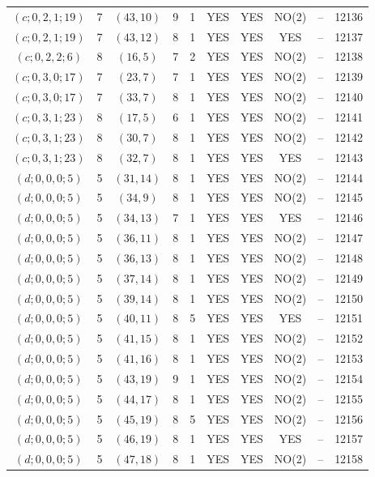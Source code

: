 \begin{longtable}{|c|c|c|c|c|c|c|c|c|c|}
$(c; 0, 2, 1; 19)$ & 7 & $(43, 10)$ & 9 & 1 & YES & YES & NO(2) & -- & 12136\\
$(c; 0, 2, 1; 19)$ & 7 & $(43, 12)$ & 8 & 1 & YES & YES & YES & -- & 12137\\
$(c; 0, 2, 2; 6)$ & 8 & $(16, 5)$ & 7 & 2 & YES & YES & NO(2) & -- & 12138\\
$(c; 0, 3, 0; 17)$ & 7 & $(23, 7)$ & 7 & 1 & YES & YES & NO(2) & -- & 12139\\
$(c; 0, 3, 0; 17)$ & 7 & $(33, 7)$ & 8 & 1 & YES & YES & NO(2) & -- & 12140\\
$(c; 0, 3, 1; 23)$ & 8 & $(17, 5)$ & 6 & 1 & YES & YES & NO(2) & -- & 12141\\
$(c; 0, 3, 1; 23)$ & 8 & $(30, 7)$ & 8 & 1 & YES & YES & NO(2) & -- & 12142\\
$(c; 0, 3, 1; 23)$ & 8 & $(32, 7)$ & 8 & 1 & YES & YES & YES & -- & 12143\\
$(d; 0, 0, 0; 5)$ & 5 & $(31, 14)$ & 8 & 1 & YES & YES & NO(2) & -- & 12144\\
$(d; 0, 0, 0; 5)$ & 5 & $(34, 9)$ & 8 & 1 & YES & YES & NO(2) & -- & 12145\\
$(d; 0, 0, 0; 5)$ & 5 & $(34, 13)$ & 7 & 1 & YES & YES & YES & -- & 12146\\
$(d; 0, 0, 0; 5)$ & 5 & $(36, 11)$ & 8 & 1 & YES & YES & NO(2) & -- & 12147\\
$(d; 0, 0, 0; 5)$ & 5 & $(36, 13)$ & 8 & 1 & YES & YES & NO(2) & -- & 12148\\
$(d; 0, 0, 0; 5)$ & 5 & $(37, 14)$ & 8 & 1 & YES & YES & NO(2) & -- & 12149\\
$(d; 0, 0, 0; 5)$ & 5 & $(39, 14)$ & 8 & 1 & YES & YES & NO(2) & -- & 12150\\
$(d; 0, 0, 0; 5)$ & 5 & $(40, 11)$ & 8 & 5 & YES & YES & YES & -- & 12151\\
$(d; 0, 0, 0; 5)$ & 5 & $(41, 15)$ & 8 & 1 & YES & YES & NO(2) & -- & 12152\\
$(d; 0, 0, 0; 5)$ & 5 & $(41, 16)$ & 8 & 1 & YES & YES & NO(2) & -- & 12153\\
$(d; 0, 0, 0; 5)$ & 5 & $(43, 19)$ & 9 & 1 & YES & YES & NO(2) & -- & 12154\\
$(d; 0, 0, 0; 5)$ & 5 & $(44, 17)$ & 8 & 1 & YES & YES & NO(2) & -- & 12155\\
$(d; 0, 0, 0; 5)$ & 5 & $(45, 19)$ & 8 & 5 & YES & YES & NO(2) & -- & 12156\\
$(d; 0, 0, 0; 5)$ & 5 & $(46, 19)$ & 8 & 1 & YES & YES & YES & -- & 12157\\
$(d; 0, 0, 0; 5)$ & 5 & $(47, 18)$ & 8 & 1 & YES & YES & NO(2) & -- & 12158\\

\end{longtable}
